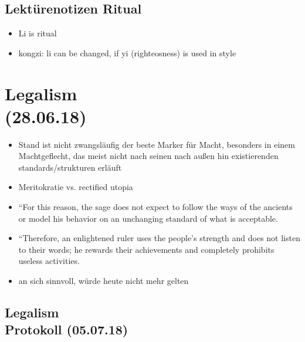\documentclass[emulatestandardclasses]{scrartcl}
\begin{document}
\subsection{Lektürenotizen Ritual}

\begin{itemize}
  \item Li is ritual
  \item kongzi: li can be changed, if yi (righteosness) is used in style
\end{itemize}


\section{Legalism\\(28.06.18)}

\begin{itemize}
  \item Stand ist nicht zwangsläufig der beste Marker für Macht, besonders in einem Machtgeflecht, das meist nicht nach seinen nach außen hin existierenden standards/strukturen erläuft
  \item Meritokratie vs. rectified utopia
  \item “For this reason, the sage does not expect to follow the ways of the ancients or model his behavior on an unchanging standard of what is acceptable. 
  \item “Therefore, an enlightened ruler uses the people’s strength and does not listen to their words; he rewards their achievements and completely prohibits useless activities. 
  \item an sich sinnvoll, würde heute nicht mehr gelten
\end{itemize}


\subsection{Legalism\\Protokoll (05.07.18)}
\end{document}
